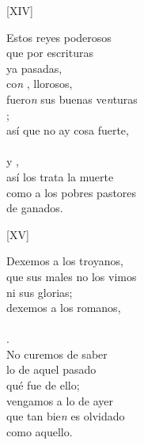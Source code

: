 \documentclass[11pt,a4paper,twoside]{article}
\begin{document}
{\begin{center}
	[XIV]
\end{center}
\pstart
Estos reyes poderosos\\
que  por escrituras\\
ya pasadas,\\
co\textit{n} , llorosos,\\
fuero\textit{n} sus buenas ve\textit{n}turas\\
;\\ así que no ay cosa fuerte,\\
\\
y ,\\
así los trata la muerte\\
como a los pobres pastores\\
de ganados.
\pend

\begin{center}
	[XV]
\end{center}
\pstart
Dexemos a los troyanos,\\
que sus males no los vimos\\
ni sus glorias;\\
dexemos a los romanos,\\
\\
.\\
No curemos de saber\\
lo de aquel  pasado\\
qué fue de ello;\\
vengamos a lo de ayer\\
que tan bie\textit{n} es olvidado\\
como aquello.
\pend

}
\end{document}
